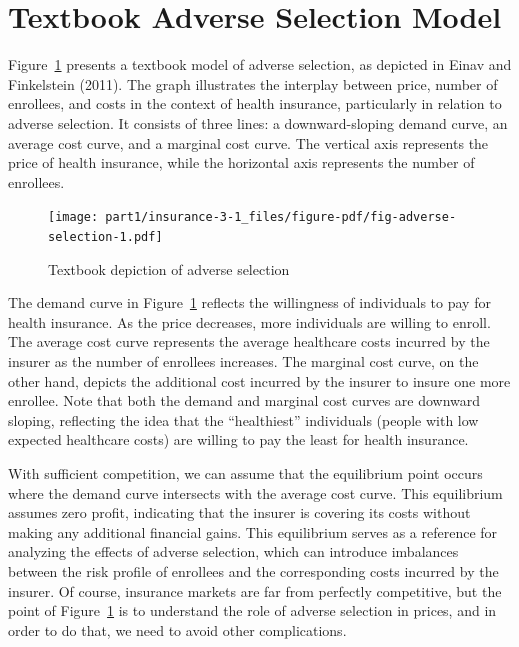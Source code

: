 \documentclass[
  letterpaper,
  DIV=11,
  numbers=noendperiod]{scrreport}
\theoremstyle{definition}
\theoremstyle{remark}
\begin{document}
\hypertarget{textbook-adverse-selection-model}{%
\section{Textbook Adverse Selection
Model}\label{textbook-adverse-selection-model}}

Figure~\ref{fig-adverse-selection} presents a textbook model of adverse
selection, as depicted in Einav and Finkelstein (2011). The graph
illustrates the interplay between price, number of enrollees, and costs
in the context of health insurance, particularly in relation to adverse
selection. It consists of three lines: a downward-sloping demand curve,
an average cost curve, and a marginal cost curve. The vertical axis
represents the price of health insurance, while the horizontal axis
represents the number of enrollees.

\begin{figure}

{\centering \texttt{[image: part1/insurance-3-1\_files/figure-pdf/fig-adverse-selection-1.pdf]}

}

\caption{\label{fig-adverse-selection}Textbook depiction of adverse
selection}

\end{figure}

The demand curve in Figure~\ref{fig-adverse-selection} reflects the
willingness of individuals to pay for health insurance. As the price
decreases, more individuals are willing to enroll. The average cost
curve represents the average healthcare costs incurred by the insurer as
the number of enrollees increases. The marginal cost curve, on the other
hand, depicts the additional cost incurred by the insurer to insure one
more enrollee. Note that both the demand and marginal cost curves are
downward sloping, reflecting the idea that the ``healthiest''
individuals (people with low expected healthcare costs) are willing to
pay the least for health insurance.

With sufficient competition, we can assume that the equilibrium point
occurs where the demand curve intersects with the average cost curve.
This equilibrium assumes zero profit, indicating that the insurer is
covering its costs without making any additional financial gains. This
equilibrium serves as a reference for analyzing the effects of adverse
selection, which can introduce imbalances between the risk profile of
enrollees and the corresponding costs incurred by the insurer. Of
course, insurance markets are far from perfectly competitive, but the
point of Figure~\ref{fig-adverse-selection} is to understand the role of
adverse selection in prices, and in order to do that, we need to avoid
other complications.
\end{document}
